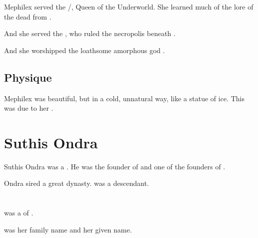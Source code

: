 \subsubsection{\Thessulax}
Mephilex served the \dragon/\taortha {}, Queen of the Underworld. 
She learned much of the lore of the dead from \Thessulax. 

And she served the \ophidian {}, who ruled the necropolis beneath \Yormis. 

And she worshipped the loathsome amorphous god . 









\subsection{Physique}
Mephilex was beautiful, but in a cold, unnatural way, like a statue of ice. 
This was due to her .















\section{Suthis Ondra}
Suthis Ondra was a \rethyax \scatha. 
He was the founder of  and one of the founders of \Ortaica. 

Ondra sired a great  dynasty. 
 was a descendant. 















\section{\TulionSperra}
\TulionSperra was a \sphyle of \Yormis. 

 was her family name and  her given name.

